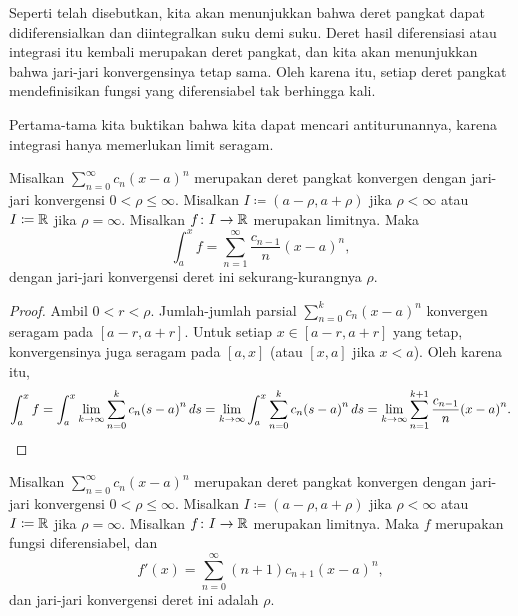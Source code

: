 Seperti telah disebutkan, kita akan menunjukkan bahwa
deret pangkat dapat didiferensialkan dan diintegralkan
suku demi suku.  Deret hasil
diferensiasi atau integrasi itu kembali merupakan deret pangkat,
dan kita akan menunjukkan bahwa jari-jari konvergensinya tetap sama.
Oleh karena itu,
setiap deret pangkat mendefinisikan fungsi yang diferensiabel tak berhingga kali.

Pertama-tama kita buktikan bahwa kita dapat mencari antiturunannya, karena integrasi hanya memerlukan
limit seragam.

\begin{cor}
Misalkan $\sum_{n=0}^\infty c_n {(x-a)}^n$ merupakan deret pangkat konvergen dengan
jari-jari konvergensi $0 < \rho \leq \infty$.
Misalkan $I \coloneqq (a-\rho,a+\rho)$ jika $\rho < \infty$
atau $I \coloneqq {\mathbb{R}}$ jika $\rho= \infty$.  Misalkan $f \colon I \to {\mathbb{R}}$ merupakan limitnya.
Maka
\begin{equation*}
\int_a^x f = \sum_{n=1}^\infty \frac{c_{n-1}}{n} {(x-a)}^{n} ,
\end{equation*}
dengan jari-jari konvergensi deret ini sekurang-kurangnya $\rho$.
\end{cor}

\begin{proof}
Ambil $0 < r < \rho$.
Jumlah-jumlah parsial $\sum_{n=0}^k c_n {(x-a)}^n$ konvergen seragam pada $[a-r,a+r]$.
Untuk setiap $x \in [a-r,a+r]$ yang tetap, konvergensinya juga seragam
pada $[a,x]$ (atau $[x,a]$ jika $x < a$).
Oleh karena itu,
\begin{equation*}
\int_a^x f =
\int_a^x \lim_{k\to\infty} \sum_{n=0}^k c_n {(s-a)}^n \, ds
=
\lim_{k\to\infty}
\int_a^x \sum_{n=0}^k c_n {(s-a)}^n \, ds
=
\lim_{k\to\infty}
\sum_{n=1}^{k+1} \frac{c_{n-1}}{n} {(x-a)}^{n} . \qedhere
\end{equation*}
\end{proof}


\begin{cor} \label{cor:differentiatepowerser}
Misalkan $\sum_{n=0}^\infty c_n {(x-a)}^n$ merupakan deret pangkat konvergen dengan
jari-jari konvergensi $0 < \rho \leq \infty$.
Misalkan $I \coloneqq (a-\rho,a+\rho)$ jika $\rho < \infty$
atau $I \coloneqq {\mathbb{R}}$ jika $\rho= \infty$.  Misalkan $f \colon I \to {\mathbb{R}}$ merupakan limitnya.
Maka $f$ merupakan fungsi diferensiabel, dan
\begin{equation*}
f'(x) = \sum_{n=0}^\infty (n+1) c_{n+1} {(x-a)}^{n} ,
\end{equation*}
dan jari-jari konvergensi deret ini adalah $\rho$.
\end{cor}

